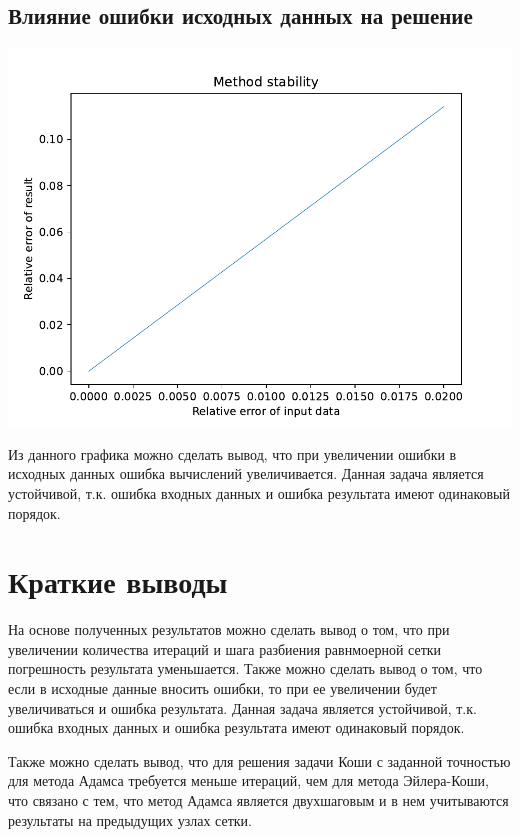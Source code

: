 \subsection{Влияние ошибки исходных данных на решение}

\includegraphics[scale=0.75]{4.pdf}

Из данного графика можно сделать вывод, что при увеличении ошибки в исходных данных ошибка вычислений увеличивается. Данная задача является устойчивой, т.к. ошибка входных данных и ошибка результата имеют одинаковый порядок.

\section{Краткие выводы}

На основе полученных результатов можно сделать вывод о том, что при увеличении количества итераций и шага разбиения равнмоерной сетки погрешность результата уменьшается. Также можно сделать вывод о том, что если в исходные данные вносить ошибки, то при ее увеличении будет увеличиваться и ошибка результата. Данная задача является устойчивой, т.к. ошибка входных данных и ошибка результата имеют одинаковый порядок. 

Также можно сделать вывод, что для решения задачи Коши с заданной точностью для метода Адамса требуется меньше итераций, чем для метода Эйлера-Коши, что связано с тем, что метод Адамса является двухшаговым и в нем учитываются результаты на предыдущих узлах сетки.


